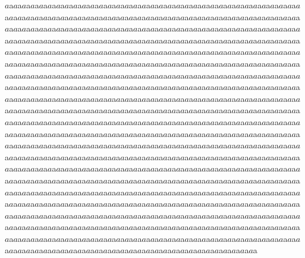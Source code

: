 \documentclass{article}
\begin{document}
$a$a$a$a$a$a$a$a$a$a$a$a$a$a$a$a$a$a$a$a$a$a$a$a$a$a$a$a$a$a$a$a$a$a$a$a$a$a$a$a$a$a$a$a$a$a$a$a$a$a$a$a$a$a$a$a$a$a$a$a$a$a$a$a$a$a$a$a$a$a$a$a$a$a$a$a$a$a$a$a$a$a$a$a$a$a$a$a$a$a$a$a$a$a$a$a$a$a$a$a$a$a$a$a$a$a$a$a$a$a$a$a$a$a$a$a$a$a$a$a$a$a$a$a$a$a$a$a$a$a$a$a$a$a$a$a$a$a$a$a$a$a$a$a$a$a$a$a$a$a$a$a$a$a$a$a$a$a$a$a$a$a$a$a$a$a$a$a$a$a$a$a$a$a$a$a$a$a$a$a$a$a$a$a$a$a$a$a$a$a$a$a$a$a$a$a$a$a$a$a$a$a$a$a$a$a$a$a$a$a$a$a$a$a$a$a$a$a$a$a$a$a$a$a$a$a$a$a$a$a$a$a$a$a$a$a$a$a$a$a$a$a$a$a$a$a$a$a$a$a$a$a$a$a$a$a$a$a$a$a$a$a$a$a$a$a$a$a$a$a$a$a$a$a$a$a$a$a$a$a$a$a$a$a$a$a$a$a$a$a$a$a$a$a$a$a$a$a$a$a$a$a$a$a$a$a$a$a$a$a$a$a$a$a$a$a$a$a$a$a$a$a$a$a$a$a$a$a$a$a$a$a$a$a$a$a$a$a$a$a$a$a$a$a$a$a$a$a$a$a$a$a$a$a$a$a$a$a$a$a$a$a$a$a$a$a$a$a$a$a$a$a$a$a$a$a$a$a$a$a$a$a$a$a$a$a$a$a$a$a$a$a$a$a$a$a$a$a$a$a$a$a$a$a$a$a$a$a$a$a$a$a$a$a$a$a$a$a$a$a$a$a$a$a$a$a$a$a$a$a$a$a$a$a$a$a$a$a$a$a$a$a$a$a$a$a$a$a$a$a$a$a$a$a$a$a$a$a$a$a$a$a$a$a$a$a$a$a$a$a$a$a$a$a$a$a$a$a$a$a$a$a$a$a$a$a$a$a$a$a$a$a$a$a$a$a$a$a$a$a$a$a$a$a$a$a$a$a$a$a$a$a$a$a$a$a$a$a$a$a$a$a$a$a$a$a$a$a$a$a$a$a$a$a$a$a$a$a$a$a$a$a$a$a$a$a$a$a$a$a$a$a$a$a$a$a$a$a$a$a$a$a$a$a$a$a$a$a$a$a$a$a$a$a$a$a$a$a$a$a$a$a$a$a$a$a$a$a$a$a$a$a$a$a$a$a$a$a$a$a$a$a$a$a$a$a$a$a$a$a$a$a$a$a$a$a$a$a$a$a$a$a$a$a$a$a$a$a$a$a$a$a$a$a$a$a$a$a$a$a$a$a$a$a$a$a$a$a$a$a$a$a$a$a$a$a$a$a$a$a$a$a$a$a$a$a$a$a$a$a$a$a$a$a$a$a$a$a$a$a$a$a$a$a$a$a$a$a$a$a$a$a$a$a$a$a$a$a$a$a$a$a$a$a$a$a$a$a$a$a$a$a$a$a$a$a$a$a$a$a$a$a$a$a$a$a$a$a$a$a$a$a$a$a$a$a$a$a$a$a$a$a$a$a$a$a$a$a$a$a$a$a$a$a$a$a$a$a$a$a$a$a$a$a$a$a$a$a$a$a$a$a$a$a$a$a$a$a$a$a$a$a$a$a$a$a$a$a$a$a$a$a$a$a$a$a$a$a$a$a$a$a$a$a$a$a$a$a$a$a$a$a$a$a$a$a$a$a$a$a$a$a$a$a$a$a$a$a$a$a$a$a$a$a$a$a$a$a$a$a$a$a$a$a$a$a$a$a$a$a$a$a$a$a$a$a$a$a$a$a$a$a$a$a$a$a$a$a$a$a$a$a$a$a$a$a$a$a$a$a$a$a$a$a$a$a$a$a$a$a$a$a$a$a$a$a$a$a$a$a$a$a$a$a$a$a$a$a$a$a$a$a$a$a$a$a$a$a$a$a$a$a$a$a$a$a$a$a$a$a$a$a$a$a$a$a$a$a$a$a$a$a$a$a$a$a$a$a$a$a$a$a$a$a$a$a$a$a$a$a$a$a$a$a$a$a$a$a$a$a$a$a$a$a$a$a$a$a$a$a$a$a$a$a$a$a$a$a$a$a$a$a$a$a$a$a$a$a$a$a$a$a$a$a$a$a$a$a$a$a$a$a$a$a$a$a$a$a$a$a$a$a$a$a$a$a$a$a$a$a$a$a$a$a$a$a$a$a$a$a$a$a$a$a$a$a$a$a$a$a$a$a$a$a$a$a$a$a$a$a$a$a$a$a$a$a$a$a$a$a$a$a$a$a$a$a$a$a$a$a$a$a$a$a$a$a$a$a$a$a$a$a$a$a$a$a$a$a$a$a$a$a$a$a$a$a$a$a$a$a$a$a$a$a$a$a$a$a$a$a$a$a$a$a$a$a$a$a$a$a$a$a$a$a$a$a$a$a$a$a$a$a$a$a$a$a$a$a$a$a$a$a$a$a$a$a$a$a$a$a$a$a$a$a$a$a$a$a$a$a$a$a$a$a$a$a$a$a$a$a$a$a$a$a$a$a$a$a$a$a$a$a$a$a$a$a$a$a$a$a$a$a$a$a$a$a$a$a$a$a$a$a$a$a$a$a$a$a$a$a$a$a$a$a$a$a$a$a$a$a$a$a$a$a$a$a$a$a$a$a$a$a$a$a$a$a$a$a$a$a$a$a$a$a$a$a$a$a$a$a$a$a$a$a$a$a$a$a$a$a$a$a$a$a$a$a$a$a$a$a$a$a$a$a$a$a$a$a$a$a$a$a$a$a$a$a$a$a$a$a$a$a$a$a$a$a$a$a$a$a$a$a$a$a$a$a$a$a$a$a$a$a$a$a$a$a$a$a$a$a$a$a$a$a$a$a$a$a$a$a$a$a$a$a$a$a$a$a$a$a$a$a$a$a$a$a$a$a$a$a$a$a$a$a$a$a$a$a$a$a$a$a$a$a$a$a$a$a$a$a$a$a$a$a$a$a$a$a$a$a$a$a$a$a$a$a$a$a$a$a$a$a$a$a$a$a$a$a$a$a$a$a$a$a$a$a$a$a$a$a$a$a$a$a$a$a$a$a$a$a$a$a$a$a$a$a$a$a$a$a$a$a$a$a$a$a$a$a$a$a$a$a$a$a$a$a$a$a$a$a$a$a$a$a$a$a$a$a$a$a$a$a$a$a$a$a$a$a$a$a$a$a$a$a$a$a$a$a$a$a$a$a$a$a$a$a$a$a$a$a$a$a$a$a$a$a$a$a
\end{document}
